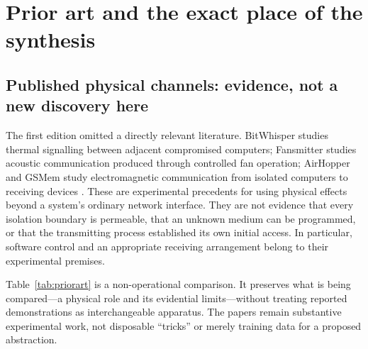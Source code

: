 \documentclass[11pt,a4paper]{article}
\theoremstyle{definition}
\theoremstyle{remark}
\begin{document}
\section{Prior art and the exact place of the synthesis}\label{sec:related}
\subsection{Published physical channels: evidence, not a new discovery here}
The first edition omitted a directly relevant literature. BitWhisper studies thermal signalling between adjacent compromised computers; Fansmitter studies acoustic communication produced through controlled fan operation; AirHopper and GSMem study electromagnetic communication from isolated computers to receiving devices \citep{bitwhisper,fansmitter,airhopper,gsmem}. These are experimental precedents for using physical effects beyond a system's ordinary network interface. They are not evidence that every isolation boundary is permeable, that an unknown medium can be programmed, or that the transmitting process established its own initial access. In particular, software control and an appropriate receiving arrangement belong to their experimental premises.

Table~\ref{tab:priorart} is a non-operational comparison. It preserves what is being compared---a physical role and its evidential limits---without treating reported demonstrations as interchangeable apparatus. The papers remain substantive experimental work, not disposable ``tricks'' or merely training data for a proposed abstraction.
\end{document}
